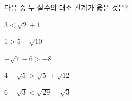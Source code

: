다음 중 두 실수의 대소 관계가 옳은 것은?
\begin{choicesii}{\rule[-3ex]{0pt}{8ex}$3<\sqrt{2}+1$}{\rule[-3ex]{0pt}{8ex}$1>5-\sqrt{10}$}{\rule[-3ex]{0pt}{8ex}$-\sqrt{7}-6>-8$}{\rule[-3ex]{0pt}{8ex}$4+\sqrt{5}>\sqrt{5}+\sqrt{12}$}{\rule[-3ex]{0pt}{8ex}$6-\sqrt{3}<\sqrt{29}-\sqrt{3}$}\end{choicesii}
